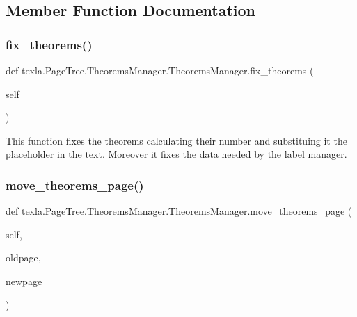 \subsection{Member Function Documentation}
\hypertarget{classtexla_1_1PageTree_1_1TheoremsManager_1_1TheoremsManager_a399fc28cf03a96352c6136a850cd46b9}{}\label{classtexla_1_1PageTree_1_1TheoremsManager_1_1TheoremsManager_a399fc28cf03a96352c6136a850cd46b9} 
\subsubsection{\texorpdfstring{fix\+\_\+theorems()}{fix\_theorems()}}
{\footnotesize\ttfamily def texla.\+Page\+Tree.\+Theorems\+Manager.\+Theorems\+Manager.\+fix\+\_\+theorems (\begin{DoxyParamCaption}\item[{}]{self }\end{DoxyParamCaption})}

\begin{DoxyVerb}This function fixes the theorems calculating their
number and substituing it the placeholder in the text.
Moreover it fixes the data needed by the label manager.\end{DoxyVerb}
 \hypertarget{classtexla_1_1PageTree_1_1TheoremsManager_1_1TheoremsManager_a31188ef920568ca338e846b292c1e0b1}{}\label{classtexla_1_1PageTree_1_1TheoremsManager_1_1TheoremsManager_a31188ef920568ca338e846b292c1e0b1} 
\subsubsection{\texorpdfstring{move\+\_\+theorems\+\_\+page()}{move\_theorems\_page()}}
{\footnotesize\ttfamily def texla.\+Page\+Tree.\+Theorems\+Manager.\+Theorems\+Manager.\+move\+\_\+theorems\+\_\+page (\begin{DoxyParamCaption}\item[{}]{self,  }\item[{}]{oldpage,  }\item[{}]{newpage }\end{DoxyParamCaption})}


